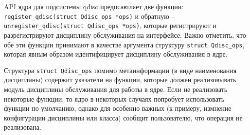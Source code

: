 	API ядра для подсистемы qdisc предосавтляет две функции: \lstinline{register_qdisc(struct Qdisc_ops *ops)}
	и обратную -- \lstinline{unregister_qdisc(struct Qdisc_ops *ops)}, которые регистрируют
	и разрегистрируют дисциплину обслуживания на интерфейсе. Важно отметить, что обе эти
	функции принимают в качестве аргумента структуру \lstinline{struct Qdisc_ops},
	которая явным образом идентифицирует дисциплину обслуживания в ядре.\cite{linuxsrc}

	Структура \lstinline{struct Qdisc_ops} помимо метаинформации (в виде наименования дисциплины)
	содержит указатели на функции, которые должен реализовывать модуль дисциплины обслуживания
	для работы в ядре.\cite{linuxsrc} Если не реализовать некоторые функции,
	то ядро в некоторых случаях попробует использовать функции по умолчанию, однако
	для особенно важных (к примеру, измнение конфигурации дисциплины или класса)
	сообщит пользователю, что операция не реализована.

